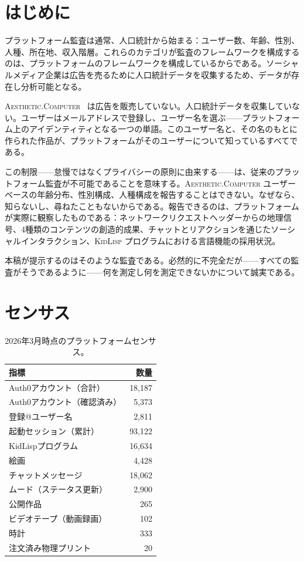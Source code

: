 \documentclass[10pt,letterpaper,twocolumn]{article}
\newcommand{\ac}{\textsc{Aesthetic.Computer}}
\newcommand{\kl}{\textsc{KidLisp}}
\begin{document}
\section{はじめに}

プラットフォーム監査は通常、人口統計から始まる：ユーザー数、年齢、性別、人種、所在地、収入階層。これらのカテゴリが監査のフレームワークを構成するのは、プラットフォームのフレームワークを構成しているからである。ソーシャルメディア企業は広告を売るために人口統計データを収集するため、データが存在し分析可能となる。

\ac{}~\citep{scudder2026ac} は広告を販売していない。人口統計データを収集していない。ユーザーはメールアドレスで登録し、ユーザー名を選ぶ——プラットフォーム上のアイデンティティとなる一つの単語。このユーザー名と、その名のもとに作られた作品が、プラットフォームがそのユーザーについて知っているすべてである。

この制限——怠慢ではなくプライバシーの原則に由来する——は、従来のプラットフォーム監査が不可能であることを意味する。\ac{} ユーザーベースの年齢分布、性別構成、人種構成を報告することはできない。なぜなら、知らないし、尋ねたこともないからである。報告できるのは、プラットフォームが実際に観察したものである：ネットワークリクエストヘッダーからの地理信号、4種類のコンテンツの創造的成果、チャットとリアクションを通じたソーシャルインタラクション、\kl{} プログラムにおける言語機能の採用状況。

本稿が提示するのはそのような監査である。必然的に不完全だが——すべての監査がそうであるように——何を測定し何を測定できないかについて誠実である。

\section{センサス}

\begin{table}[h]
\small
\centering
\begin{tabularx}{\columnwidth}{Xr}
\toprule
\textbf{指標} & \textbf{数量} \\
\midrule
Auth0アカウント（合計） & 18,187 \\
Auth0アカウント（確認済み） & 5,373 \\
登録@ユーザー名 & 2,811 \\
起動セッション（累計） & 93,122 \\
\midrule
KidLispプログラム & 16,634 \\
絵画 & 4,428 \\
チャットメッセージ & 18,062 \\
ムード（ステータス更新） & 2,900 \\
公開作品 & 265 \\
ビデオテープ（動画録画） & 102 \\
時計 & 333 \\
注文済み物理プリント & 20 \\
\bottomrule
\end{tabularx}
\caption{2026年3月時点のプラットフォームセンサス。}
\label{tab:census}
\end{table}
\end{document}
